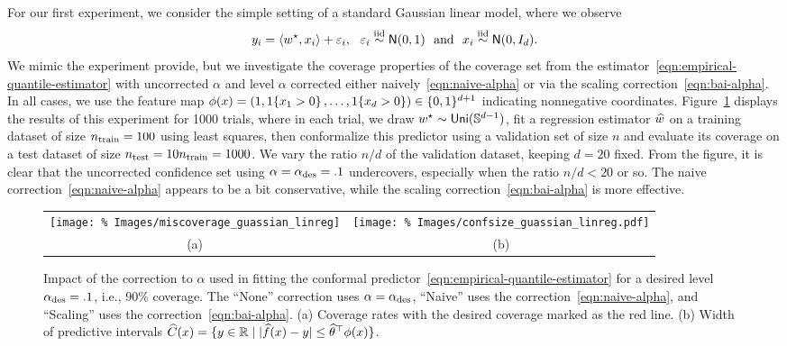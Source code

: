 \documentclass{article}
\begin{document}

\newcommand{\noise}{\varepsilon}

For our first experiment, we consider the simple setting of
a standard Gaussian linear model, where we observe
\begin{equation*}
  y_i = \<w\opt, x_i\> + \noise_i,
  ~~ \noise_i \simiid \normal(0, 1)
  ~~ \mbox{and} ~~ x_i \simiid \normal(0, I_d).
\end{equation*}
We mimic the experiment \citet[Fig.~3]{GibbsChCa23} provide,
but we investigate the coverage properties of the
coverage set from the estimator~\eqref{eqn:empirical-quantile-estimator}
with uncorrected $\alpha$ and level $\alpha$ corrected
either naively~\eqref{eqn:naive-alpha} or via the scaling
correction~\eqref{eqn:bai-alpha}.
%
In all cases, we use the feature map $\phi(x) = (1, 1\!\left\{x_1 > 0\right\}, \ldots,
1\!\left\{x_d > 0\right\}) \in \{0, 1\}^{d + 1}$ indicating nonnegative coordinates.
%
Figure~\ref{fig:simulation-correction-coverage} displays the results of this
experiment for 1000 trials, where in each trial, we draw $w^\star \sim
\mathsf{Uni}(\mathbb{S}^{d-1})$, fit a regression estimator $\widehat{w}$ on a
training dataset of size $n_{\textup{train}} = 100$ using least squares,
then conformalize this predictor using a validation set of size $n$ and
evaluate its coverage on a test dataset of size $n_{\textup{test}} = 10
n_{\textup{train}} = 1000$.
%
We vary the
ratio $n / d$ of the validation dataset, keeping $d = 20$ fixed.
%
From the figure, it is clear that the uncorrected confidence
set using $\alpha = \alpha_{\textup{des}} = .1$
undercovers, especially when the ratio $n/d < 20$ or so.
%
The naive correction~\eqref{eqn:naive-alpha} appears to be a bit
conservative, while the scaling correction~\eqref{eqn:bai-alpha}
is more effective.

\begin{figure}[ht]
  \begin{center}
    \begin{tabular}{cc}
      \hspace{-1cm}
      \texttt{[image: \%
        Images/miscoverage\_guassian\_linreg]} &
      \hspace{-.5cm}
      \texttt{[image: \%
        Images/confsize\_guassian\_linreg.pdf]} \\
      (a) & (b)
    \end{tabular}
    \caption{\label{fig:simulation-correction-coverage} Impact of the
      correction to $\alpha$ used in fitting the conformal
      predictor~\eqref{eqn:empirical-quantile-estimator} for a desired level
      $\alpha_{\textup{des}} = .1$, i.e., 90\% coverage. The ``None'' correction
      uses $\alpha = \alpha_{\textup{des}}$, ``Naive'' uses the
      correction~\eqref{eqn:naive-alpha}, and ``Scaling'' uses the
      correction~\eqref{eqn:bai-alpha}.  (a) Coverage rates with the desired
      coverage marked as the red line. (b) Width of predictive intervals
      $\widehat{C}(x) = \{y \in \mathbb{R} \mid |\widehat{f}(x) - y| \le
      \widehat{\theta}^\top \phi(x)\}$.}
  \end{center}
\end{figure}
\end{document}
